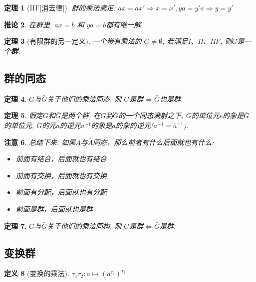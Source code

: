 \documentclass[UTF8]{ctexart}
\newtheorem{Definition}{定义}%
\newtheorem{Theorem}[Definition]{定理}
\newtheorem{Remark}[Definition]{注意}
\newtheorem{Corollary}[Definition]{推论}
\begin{document}
\begin{Theorem}[III'\mbox{[消去律]}]
群的乘法满足: $ax = ax' \Rightarrow x = x', ya = y'a \Rightarrow y = y'$
\end{Theorem}

\begin{Corollary}
在群里, $ax = b$ 和 $ya = b$都有唯一解.
\end{Corollary}

\begin{Theorem}[有限群的另一定义]
一个带有乘法的   $G \neq \emptyset$, 若满足I、II、III', 则$G$是一个\textbf{群}.
\end{Theorem}

\subsection{群的同态}

\begin{Theorem}
$G$与$\bar{G}$关于他们的乘法同态, 则 $G$是群$\Rightarrow \bar{G}$也是群.
\end{Theorem}

\begin{Theorem}
假定$G$和$\bar{G}$是两个群, 在$G$到$\bar{G}$的一个同态满射之下, $G$的单位元$e$的象是$\bar{G}$的单位元, $G$的元$a$的逆元$a^{-1}$的象是$a$的象的逆元($\overline{a^{-1}} = \bar{a}^{-1}$).
\end{Theorem}

\begin{Remark}
总结下来, 如果$A$与$\bar{A}$同态，那么前者有什么后面就也有什么:
\begin{itemize}
	\item 前面有结合，后面就也有结合
	\item 前面有交换，后面就也有交换
	\item 前面有分配，后面就也有分配
	\item 前面是群，后面就也是群
\end{itemize}
\end{Remark}

\begin{Theorem}
$G$与$\bar{G}$关于他们的乘法同构, 则 $G$是群$\Leftrightarrow \bar{G}$是群.
\end{Theorem}

\subsection{变换群}

\begin{Definition}[变换的乘法]
$\tau_1 \tau_2: a \mapsto {\left(a^{\tau_1}\right)}^{\tau_2}$
\end{Definition}
\end{document}
